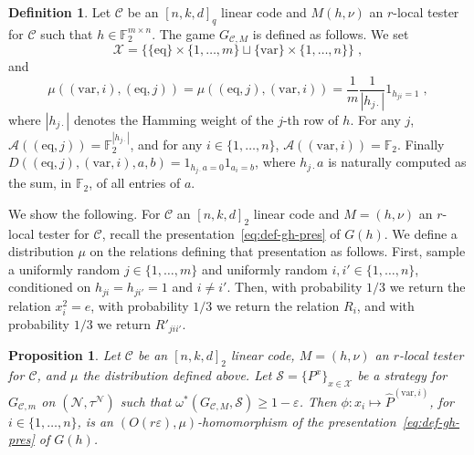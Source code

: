 \documentclass[11pt]{article}
\newtheorem{proposition}[theorem]{Proposition}
\theoremstyle{definition}
\newtheorem{definition}[theorem]{Definition}
\newcommand{\code}{\mathscr{C}}
\newcommand{\strategy}{\mathscr{S}}
\newcommand{\F}{\ensuremath{\mathbb{F}}}
\newcommand{\mA}{\ensuremath{\mathcal{A}}}
\newcommand{\mX}{\ensuremath{\mathcal{X}}}
\newcommand{\eps}{\varepsilon}
\newcommand{\mN}{\mathcal{N}}
\newcommand{\eq}{\mathrm{eq}}
\newcommand{\var}{\mathrm{var}}
\begin{document}
\begin{definition}
Let $\code$ be an $[n,k,d]_q$ linear code and $M(h,\nu)$ an $r$-local tester for $\code$ such that $h\in \F_2^{m\times n}$. The game $G_{\code,M}$ is defined as follows. We set 
\[\mX = \big\{ \{\eq\}\times\{1,\ldots,m\} \sqcup\{\var\}\times \{1,\ldots,n\}\big\}\;,\]
and
\[\mu((\var,i),(\eq,j))=\mu((\eq,j),(\var,i)) = \frac{1}{m} \frac{1}{|h_{j\cdot}|} 1_{h_{ji}=1}\;,\]
where $|h_{j\cdot}|$ denotes the Hamming weight of the $j$-th row of $h$. For any $j$, $\mA((\eq,j))=\F_2^{|h_{j\cdot}|}$, and for any $i\in\{1,\ldots,n\}$, $\mA((\var,i))=\F_2$. Finally $D((\eq,j),(\var,i),a,b)=1_{h_{j\cdot} a=0} 1_{a_i=b}$, where $h_{j\cdot}a$ is naturally computed as the sum, in $\F_2$, of all entries of $a$.  
\end{definition}

We show the following. For $\code$ an $[n,k,d]_2$ linear code and $M=(h,\nu)$ an $r$-local tester for $\code$, recall the presentation~\eqref{eq:def-gh-pres} of $G(h)$. We define a distribution $\mu$ on the relations defining that presentation as follows. First, sample a uniformly random $j\in\{1,\ldots,m\}$ and uniformly random $i,i'\in\{1,\ldots,n\}$, conditioned on $h_{ji}=h_{ji'}=1$ and $i\neq i'$. Then, with probability $1/3$ we return the relation $x_i^2=e$, with probability $1/3$ we return the relation $R_i$, and with probability $1/3$ we return $R'_{jii'}$. 

\begin{proposition}\label{prop:rep-game}
Let $\code$ be an $[n,k,d]_2$ linear code, $M=(h,\nu)$ an $r$-local tester for $\code$, and $\mu$ the distribution defined above. Let $\strategy = \{P^{x}\}_{x \in \mX}$ be a strategy for $G_{\code,m}$ on $(\mN,\tau^\mN)$ such that $\omega^*(G_{\code,M},\strategy)\geq 1-\eps$. Then $\phi:x_i\mapsto {\widehat{P}}^{(\var,i)}$, for $i\in\{1,\ldots,n\}$, is an $(O(r\eps),\mu)$-homomorphism of the presentation~\eqref{eq:def-gh-pres} of $G(h)$.
\end{proposition}
\end{document}
